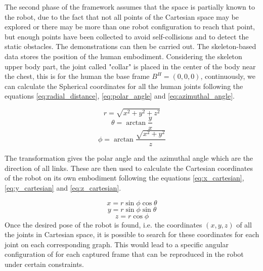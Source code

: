 \documentclass[thesis]{mas_proposal}
\begin{document}
\begin{itemize}
	The second phase of the framework assumes that the space is partially known to the robot, due to the fact that not all points of the Cartesian space may be explored or there may be more than one robot configuration to reach that point, but enough points have been collected to avoid self-collisions and to detect the static obstacles.  The demonstrations can then be carried out. The skeleton-based data stores the position of the human embodiment. Considering the skeleton upper body part, the joint called "collar" is placed in the center of the body near the chest, this is for the human the base frame $B^H = (0, 0, 0)$, continuously, we can calculate the Spherical coordinates for all the human joints following the equations \ref{eq:radial_distance}, \ref{eq:polar_angle} and \ref{eq:azimuthal_angle}.
	
	\begin{equation}
		 r = \sqrt{x^2 + y^2 + z^2}
	\label{eq:radial_distance}
	\end{equation}
	\begin{equation}
		\theta = \arctan \frac{y}{x}
	\label{eq:polar_angle}
	\end{equation}
	\begin{equation}
		\phi = \arctan \frac{\sqrt{x^2 + y^2}}{z}
	\label{eq:azimuthal_angle}
	\end{equation}

	The transformation gives the polar angle and the azimuthal angle which are the direction of all links. These are then used to calculate the Cartesian coordinates of the robot on its own embodiment following the equations \ref{eq:x_cartesian}, \ref{eq:y_cartesian} and \ref{eq:z_cartesian}. 
	
	\begin{equation}
		x = r \sin \phi \cos \theta
		\label{eq:x_cartesian}
	\end{equation}
	\begin{equation}
		y = r \sin \phi \sin \theta
		\label{eq:y_cartesian}
	\end{equation}
	\begin{equation}
		z = r \cos \phi
		\label{eq:z_cartesian}
	\end{equation}
	Once the desired pose of the robot is found, i.e. the coordinates $(x,y,z)$ of all the joints in Cartesian space, it is possible to search for these coordinates for each joint on each corresponding graph. This would lead to a specific angular configuration of for each captured frame that can be reproduced in the robot under certain constraints.	
\end{itemize}
\end{document}
